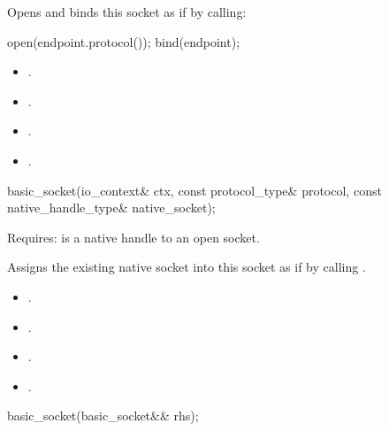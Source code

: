 \begin{itemdescr}
\pnum
\effects Opens and binds this socket as if by calling: 
\begin{codeblock}
open(endpoint.protocol());
bind(endpoint);
\end{codeblock}


\pnum
\postconditions 
\begin{itemize}
\item
{}.
\item
{}.
\item
{}.
\item
{}.
\end{itemize}
\end{itemdescr}

\begin{itemdecl}
basic_socket(io_context& ctx, const protocol_type& protocol,
             const native_handle_type& native_socket);
\end{itemdecl}

\begin{itemdescr}
\pnum
Requires:  is a native handle to an open socket.

\pnum
\effects Assigns the existing native socket into this socket as if by calling .

\pnum
\postconditions 
\begin{itemize}
\item
{}.
\item
{}.
\item
{}.
\item
{}.
\end{itemize}
\end{itemdescr}

\begin{itemdecl}
basic_socket(basic_socket&& rhs);
\end{itemdecl}

